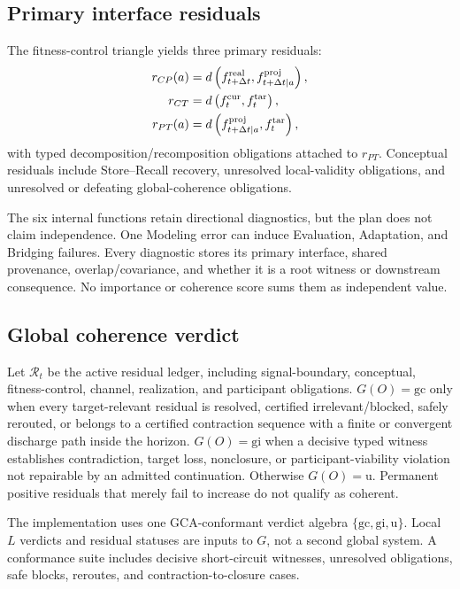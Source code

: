\documentclass[11pt]{article}
\newcommand{\gc}{\mathrm{gc}}
\newcommand{\gi}{\mathrm{gi}}
\newcommand{\uu}{\mathrm{u}}
\begin{document}
\subsection{Primary interface residuals}

The fitness-control triangle yields three primary residuals:
\begin{align}
r_{CP}(a)&=d\left(f^{\rm real}_{t+\Delta t},f^{\rm proj}_{t+\Delta t\mid a}\right),\\
r_{CT}&=d\left(f^{\rm cur}_t,f^{\rm tar}_t\right),\\
r_{PT}(a)&=d\left(f^{\rm proj}_{t+\Delta t\mid a},f^{\rm tar}_t\right),
\end{align}
with typed decomposition/recomposition obligations attached to $r_{PT}$. Conceptual residuals include Store--Recall recovery, unresolved local-validity obligations, and unresolved or defeating global-coherence obligations.

The six internal functions retain directional diagnostics, but the plan does not claim independence. One Modeling error can induce Evaluation, Adaptation, and Bridging failures. Every diagnostic stores its primary interface, shared provenance, overlap/covariance, and whether it is a root witness or downstream consequence. No importance or coherence score sums them as independent value.

\subsection{Global coherence verdict}

Let $\mathscr R_t$ be the active residual ledger, including signal-boundary, conceptual, fitness-control, channel, realization, and participant obligations. $G(O)=\gc$ only when every target-relevant residual is resolved, certified irrelevant/blocked, safely rerouted, or belongs to a certified contraction sequence with a finite or convergent discharge path inside the horizon. $G(O)=\gi$ when a decisive typed witness establishes contradiction, target loss, nonclosure, or participant-viability violation not repairable by an admitted continuation. Otherwise $G(O)=\uu$. Permanent positive residuals that merely fail to increase do not qualify as coherent.

The implementation uses one GCA-conformant verdict algebra $\{\gc,\gi,\uu\}$. Local $L$ verdicts and residual statuses are inputs to $G$, not a second global system. A conformance suite includes decisive short-circuit witnesses, unresolved obligations, safe blocks, reroutes, and contraction-to-closure cases.
\end{document}
